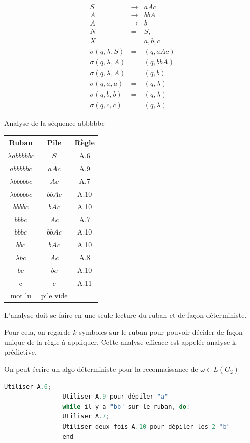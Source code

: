 \documentclass[12pt,a4paper,openany]{book}
\begin{document}
		\begin{exemple}
			\begin{eqnarray}
				S &\rightarrow& aAc\\
				A &\rightarrow& bbA \\
				A &\rightarrow& b \\
				N &=& S,\\
				X &=& a, b, c\\
				\sigma(q, \lambda, S)& =& (q, aAc) \\
				\sigma(q, \lambda, A) &=& (q, bbA)\\
				\sigma(q, \lambda, A) &=& (q, b)\\
				\sigma(q, a, a) &=& (q, \lambda)\\
				\sigma(q, b, b) &=& (q, \lambda)\\
				\sigma(q, c, c) &=& (q, \lambda)
			\end{eqnarray}

			\begin{center}
				Analyse de la séquence abbbbbc

				\begin{tabular}{ccc}
					\textbf{Ruban} & \textbf{Pile} & \textbf{Règle}\\
					\hline
					$\lambda abbbbbc$ &$S$ &A.6\\
					$abbbbbc$ &$aAc$& A.9\\
					$\lambda bbbbbc$ &$Ac$ &A.7\\
					$\lambda bbbbbc$ &$bbAc$& A.10\\
					$bbbbc$ &$bAc$& A.10\\
					$bbbc$ &$Ac$ &A.7\\
					$bbbc$ &$bbAc$& A.10\\
					$bbc$& $bAc$& A.10\\
					$\lambda bc$&$ Ac$& A.8\\
					$bc$& $bc$& A.10\\
					c &$c$& A.11\\
					mot lu &pile vide&
				\end{tabular}
			\end{center}

			L'analyse doit se faire en une seule lecture du ruban et de façon déterministe. 

			Pour cela, on regarde $k$ symboles sur le ruban pour pouvoir décider de façon unique de la règle à appliquer. 
			Cette analyse efficace est appelée analyse k-prédictive.

			On peut écrire un algo déterministe pour la reconnaissance de $\omega \in L(G_2 )$
			\begin{lstlisting}[language=C,numbers=none]
				Utiliser A.6;
				Utiliser A.9 pour dépiler "a"
				while il y a "bb" sur le ruban, do:
				Utiliser A.7;
				Utiliser deux fois A.10 pour dépiler les 2 "b"
				end
			\end{lstlisting}
		\end{exemple}
		\listoffigures

		
\end{document}
